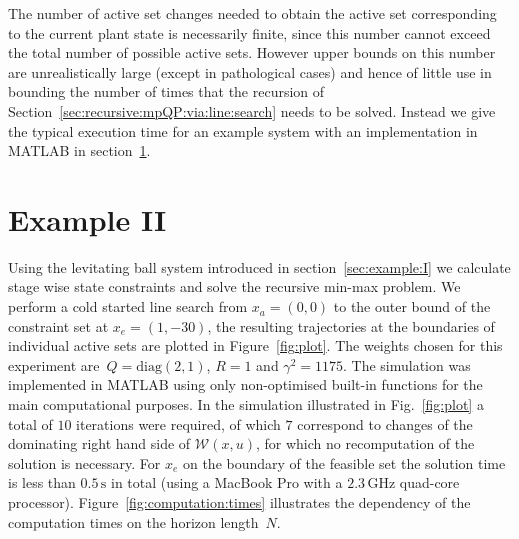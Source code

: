 \documentclass[journal]{IEEEtran}
\theoremstyle{remark}
\theoremstyle{definition}
\begin{document}
The number of active set changes needed to obtain the active set corresponding to the current plant state
is necessarily finite, since this number cannot exceed the total number of possible active sets. 
%
However upper bounds on this number are unrealistically large (except in pathological cases) and hence of 
little use in bounding the number of times that the recursion of Section~\ref{sec:recursive:mpQP:via:line:search} 
needs to be solved. 
%
Instead we give the typical execution time for an example system with an implementation in MATLAB  in 
section~\ref{sec:example:II}.
%


\section{Example II}\label{sec:example:II}

Using the levitating ball system introduced in section~\ref{sec:example:I} we calculate stage wise state constraints
and solve the recursive min-max problem.
%
We perform a cold started line search from $x_a=(0,0)$ to the outer bound of the constraint set at $x_e=(1,-30)$, 
the resulting trajectories at the boundaries of individual active sets are plotted in Figure~\ref{fig:plot}.
%
The weights chosen for this experiment are~$Q=\text{diag}(2,1)$, $R=1$ and $\gamma^2=1175$.
%
The simulation was implemented in MATLAB using only non-optimised built-in functions for the main computational
purposes. 
%
In the simulation illustrated in Fig.~\ref{fig:plot} a total of $10$ iterations were required,
of which $7$ correspond to changes of the dominating right hand side of $\mathcal W(x,u)$, for which no
recomputation of the solution is necessary.
%
For $x_e$ on the boundary of the feasible set the solution time is less than $0.5\, \text{s}$ in total 
(using a MacBook Pro with a $2.3\,\text{GHz}$ quad-core processor).
%
Figure~\ref{fig:computation:times} illustrates the dependency of the computation times on the horizon length~$N$.
\end{document}
